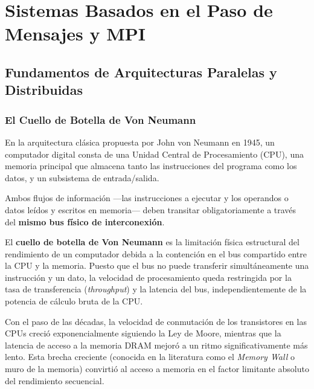 \chapter{Sistemas Basados en el Paso de Mensajes y MPI}
\label{cap:tema3}


\section{Fundamentos de Arquitecturas Paralelas y Distribuidas}

\subsection{El Cuello de Botella de Von Neumann}
En la arquitectura clásica propuesta por John von Neumann en 1945, un computador digital consta de una Unidad Central de Procesamiento (CPU), una memoria principal que almacena tanto las instrucciones del programa como los datos, y un subsistema de entrada/salida. 

Ambos flujos de información —las instrucciones a ejecutar y los operandos o datos leídos y escritos en memoria— deben transitar obligatoriamente a través del \textbf{mismo bus físico de interconexión}.

\begin{definicion}
El \textbf{cuello de botella de Von Neumann} es la limitación física estructural del rendimiento de un computador debida a la contención en el bus compartido entre la CPU y la memoria. Puesto que el bus no puede transferir simultáneamente una instrucción y un dato, la velocidad de procesamiento queda restringida por la tasa de transferencia (\emph{throughput}) y la latencia del bus, independientemente de la potencia de cálculo bruta de la CPU.
\end{definicion}

Con el paso de las décadas, la velocidad de conmutación de los transistores en las CPUs creció exponencialmente siguiendo la Ley de Moore, mientras que la latencia de acceso a la memoria DRAM mejoró a un ritmo significativamente más lento. Esta brecha creciente (conocida en la literatura como el \emph{Memory Wall} o muro de la memoria) convirtió al acceso a memoria en el factor limitante absoluto del rendimiento secuencial.

